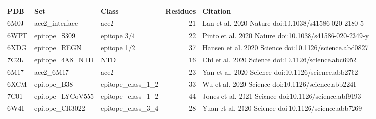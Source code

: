 \begin{longtable}{lllrl}
\toprule PDB & Set & Class & Residues & Citation\\\midrule\endhead
6M0J & ace2_interface & ace2 & 21 & \scriptsize Lan et al. 2020 Nature doi:10.1038/s41586-020-2180-5\\
6WPT & epitope_S309 & epitope 3/4 & 22 & \scriptsize Pinto et al. 2020 Nature doi:10.1038/s41586-020-2349-y\\
6XDG & epitope_REGN & epitope 1/2 & 37 & \scriptsize Hansen et al. 2020 Science doi:10.1126/science.abd0827\\
7C2L & epitope_4A8_NTD & NTD & 16 & \scriptsize Chi et al. 2020 Science doi:10.1126/science.abc6952\\
6M17 & ace2_6M17 & ace2 & 23 & \scriptsize Yan et al. 2020 Science doi:10.1126/science.abb2762\\
6XCM & epitope_B38 & epitope_class_1_2 & 33 & \scriptsize Wu et al. 2020 Science doi:10.1126/science.abb2241\\
7C01 & epitope_LYCoV555 & epitope_class_1_2 & 44 & \scriptsize Jones et al. 2021 Science doi:10.1126/science.abf9193\\
6W41 & epitope_CR3022 & epitope_class_3_4 & 28 & \scriptsize Yuan et al. 2020 Science doi:10.1126/science.abb7269\\
\bottomrule
\end{longtable}
